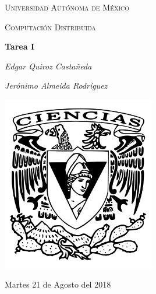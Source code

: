 \documentclass[12pt,a4paper]{report}
\begin{document}
\begin{titlepage}
	\centering
	{\scshape\LARGE Universidad Autónoma de México \par}
	\vspace{1cm}
	{\scshape\Large Computación Distribuida\par}
	\vspace{1.5cm}
	{\huge\bfseries Tarea I\par}
	\vspace{.5cm}
	{\Large\itshape Edgar Quiroz Castañeda \par}
    \vspace{.5cm}
	{\Large\itshape Jerónimo Almeida Rodríguez \par}
	\vfill
	 \includegraphics[width=0.5\textwidth]{escudo_f-ciencias.png}
	\vfill

	{\large Martes 21 de Agosto del 2018 \par}
\end{titlepage}

\pagebreak
\setlength{\voffset}{-0.75in}
\setlength{\headsep}{5pt}

\newcommand{\ed}[2]{(#1) edge (#2)}
\newcommand{\eee}[4]{\path [->,draw,thin] ($ (#1) !.5! (#2)$) -- ($ (#3) !.5! (#4) $);}
\end{document}
